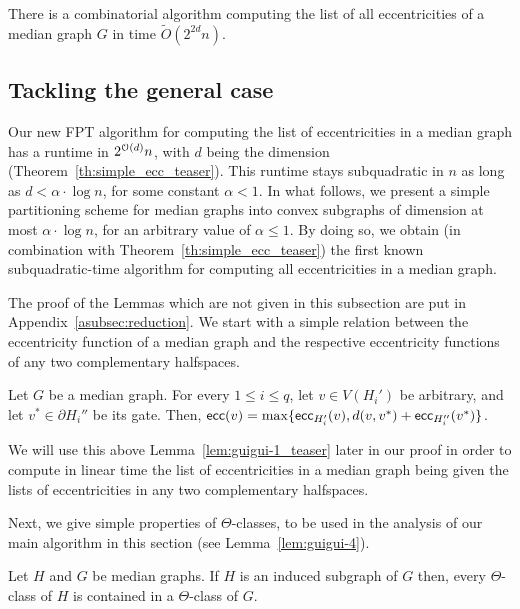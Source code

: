\documentclass[a4paper,UKenglish,numberwithinsect,cleveref, autoref]{lipics-v2021}
\newcommand{\ecc}{\mbox{\textsf{ecc}}}
\begin{document}
\begin{theorem}[\ref{th:simple_ecc}]
There is a combinatorial algorithm computing the list of all eccentricities of a median graph $G$ in time $\tilde{O}(2^{2d}n)$.
\label{th:simple_ecc_teaser}
\end{theorem}

\subsection{Tackling the general case} \label{subsec:reduction}

Our new FPT algorithm for computing the list of eccentricities in a median graph has a runtime in $2^{{\cal O}(d)}n$, with $d$ being the dimension (Theorem~\ref{th:simple_ecc_teaser}). 
This runtime stays subquadratic in $n$ as long as $d < \alpha \cdot \log{n}$, for some constant $\alpha < 1$.
In what follows, we present a simple partitioning scheme for median graphs into convex subgraphs of dimension at most $\alpha \cdot \log{n}$, for an arbitrary value of $\alpha \leq 1$.
By doing so, we obtain (in combination with Theorem~\ref{th:simple_ecc_teaser}) the first known subquadratic-time algorithm for computing all eccentricities in a median graph.

The proof of the Lemmas which are not given in this subsection are put in Appendix~\ref{asubsec:reduction}. We start with a simple relation between the eccentricity function of a median graph and the respective eccentricity functions of any two complementary halfspaces.

\begin{lemma}[\ref{lem:guigui-1}]\label{lem:guigui-1_teaser}
Let $G$ be a median graph.
For every $1 \leq i \leq q$, let $v \in V(H_i')$ be arbitrary, and let $v^* \in \partial H_i''$ be its gate.
Then, $\ecc(v) = \max\{\ecc_{H_i'}(v), d(v,v^*) + \ecc_{H_i''}(v^*)\}$.
\end{lemma}

We will use this above Lemma~\ref{lem:guigui-1_teaser} later in our proof in order to compute in linear time the list of eccentricities in a median graph being given the lists of eccentricities in any two complementary halfspaces.

Next, we give simple properties of $\Theta$-classes, to be used in the analysis of our main algorithm in this section (see Lemma~\ref{lem:guigui-4}).

\begin{lemma}[\ref{lem:guigui-2}]\label{lem:guigui-2_teaser}
Let $H$ and $G$ be median graphs.
If $H$ is an induced subgraph of $G$ then, every $\Theta$-class of $H$ is contained in a $\Theta$-class of $G$.
\end{lemma}
\end{document}
